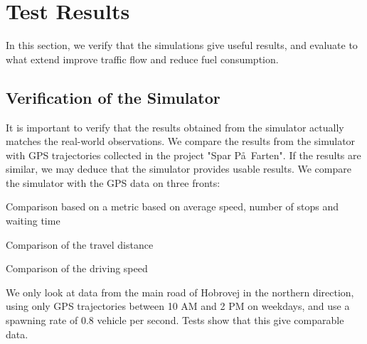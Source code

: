 \section{Test Results}\label{sec:Test}
In this section, we verify that the simulations give useful results, and evaluate to what extend \tech improve traffic flow and reduce fuel consumption.

\subsection{Verification of the Simulator}
It is important to verify that the results obtained from the simulator actually matches the real-world observations.
We compare the results from the simulator with GPS trajectories collected in the project "Spar P\aa\ Farten".
If the results are similar, we may deduce that the simulator provides usable results.
We compare the simulator with the GPS data on three fronts: 
\vspace{-4mm}
\begin{enumerate*}
\item Comparison based on a metric based on average speed, number of stops and waiting time
\item Comparison of the travel distance 
\item Comparison of the driving speed
\end{enumerate*}
\vspace{-4mm}

We only look at data from the main road of Hobrovej in the northern direction, using only GPS trajectories between 10 AM and 2 PM on weekdays, and use a spawning rate of $0.8$ vehicle per second.
Tests show that this give comparable data.

